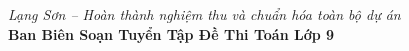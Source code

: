 \vspace{0.4cm}
\begin{flushright}
\textit{Lạng Sơn -- Hoàn thành nghiệm thu và chuẩn hóa toàn bộ dự án}\\
\textbf{Ban Biên Soạn Tuyển Tập Đề Thi Toán Lớp 9}
\end{flushright}
\clearpage
